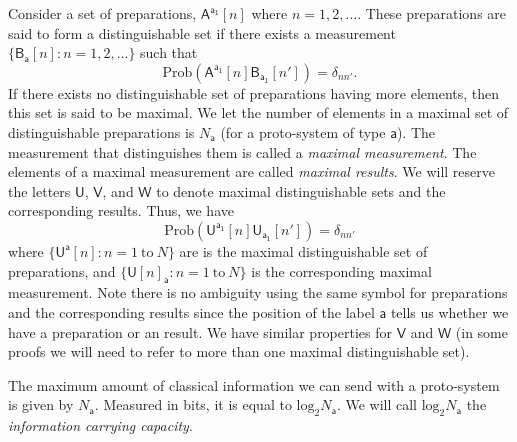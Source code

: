 \documentclass[10pt]{article}
\begin{document}
Consider a set of preparations, $\mathsf{A}^\mathsf{a_1}[n]$ where $n=1, 2, \dots$.  These preparations are said to form a distinguishable set if there exists a measurement $\{ \mathsf{B}_\mathsf{a}[n]: n=1, 2, \dots\}$ such that
\begin{equation}
\text{Prob}(\mathsf{A}^\mathsf{a_1}[n]\mathsf B_\mathsf{a_1}[n'] )=\delta_{nn'}.
\end{equation}
If there exists no distinguishable set of preparations having more elements, then this set is said to be maximal.  We let the number of elements in a maximal set of distinguishable preparations is $N_\mathsf{a}$  (for a proto-system of type $\mathsf a$).  The measurement that distinguishes them is called a \emph{maximal measurement}.  The elements of a maximal measurement are called \emph{maximal results}.  We will reserve the letters $\mathsf{U}$, $\mathsf{V}$, and $\mathsf{W}$ to denote maximal distinguishable sets and the corresponding results.  Thus, we have
\begin{equation}\label{uaua}
\text{Prob}(\mathsf{U}^\mathsf{a_1}[n]\mathsf U_\mathsf{a_1}[n'])=\delta_{nn'}
\end{equation}
where $\{ \mathsf{U}^\mathsf{a}[n]: n=1~\text{to}~ N\}$  are is the maximal distinguishable set of preparations, and $\{ \mathsf{U}[n]_\mathsf{a}: n=1~\text{to}~ N\}$ is the corresponding maximal measurement. Note there is no ambiguity using the same symbol for preparations and the corresponding results since the position of the label $\mathsf{a}$ tells us whether we have a preparation or an result.  We have similar properties for $\mathsf V$ and $\mathsf W$ (in some proofs we will need to refer to more than one maximal distinguishable set).

The maximum amount of classical information we can send with a proto-system is given by $N_\mathsf{a}$.  Measured in bits, it is equal to $\text{log}_2 N_\mathsf{a}$.  We will call $\text{log}_2 N_\mathsf{a}$ the \emph{information carrying capacity}.
\end{document}
